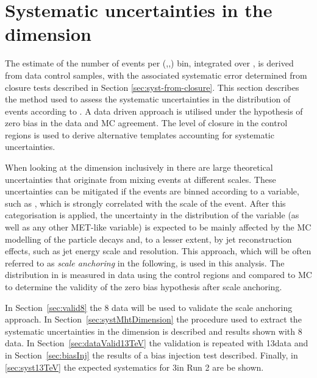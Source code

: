 \section{Systematic uncertainties in the \mht dimension}
\label{sec:syst-on-shape}

The estimate of the number of events per (\njet,\nb,\scalht) bin,
integrated over \mht, is derived from data control samples, with
the associated systematic error determined from closure tests
described in Section \ref{sec:syst-from-closure}. This section
describes the method used to assess the systematic uncertainties in
the distribution of events according to \mht. A data driven approach is
utilised under the hypothesis of zero bias in the data and MC agreement.
The level of closure in the control regions is used
to derive alternative templates accounting for systematic uncertainties.

When looking at the \mht dimension inclusively in \scalht there are
large theoretical uncertainties that originate from mixing events
at different scales. These uncertainties can be mitigated if the events 
are binned according to a variable, such as \scalht, 
which is strongly correlated with the scale of the event. 
After this categorisation is applied, the uncertainty in 
the distribution of the \mht variable
(as well as any other MET-like variable) is expected to be 
mainly affected by the MC modelling of the particle 
decays and, to a lesser extent, by jet reconstruction effects, 
such as jet energy scale and resolution. 
This approach, which will be often referred to as \textit{scale anchoring}
in the following, is used in this analysis. The distribution in \mht
is measured in data using the control regions and compared to MC
to determine the validity of the zero bias hypothesis after scale anchoring.

In Section~\ref{sec:valid8} the 8 \TeV data will be used 
to validate the scale anchoring approach. 
In Section~\ref{sec:systMhtDimension} 
the procedure used to extract the systematic uncertainties in the 
\mht dimension is described and results shown with 8 \TeV data. 
In Section~\ref{sec:dataValid13TeV} the validation is repeated with 13\TeV data
and in Section~\ref{sec:biasInj} the results of a bias injection test described.
Finally, in \ref{sec:syst13TeV} the expected systematics for 3\ifb in Run 2 are be shown. 



